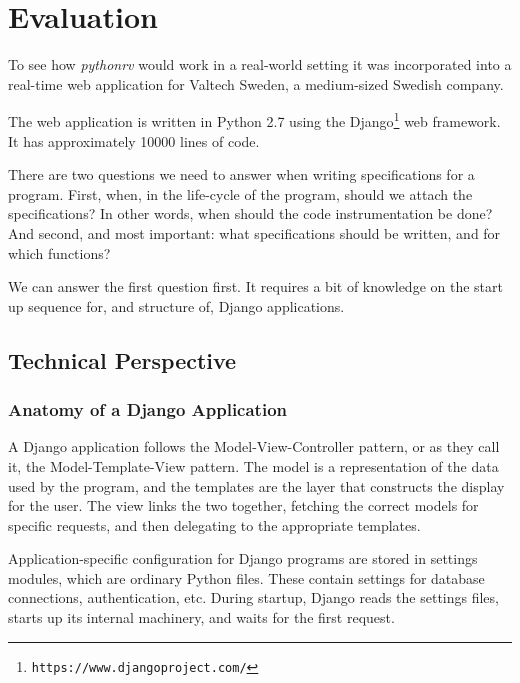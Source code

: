 
\pagestyle{newchap}
\chapter{Evaluation} \label{chapter-evaluation}

To see how \textit{pythonrv} would work in a real-world setting it was
incorporated into a real-time web application for Valtech Sweden, a
medium-sized Swedish company.

The web application is written in Python 2.7 using the
Django\footnote{\texttt{https://www.djangoproject.com/}} web framework. It has
approximately 10000 lines of code.

There are two questions we need to answer when writing specifications for a
program. First, when, in the life-cycle of the program, should we attach the
specifications? In other words, when should the code instrumentation be done?
And second, and most important: what specifications should be written, and for
which functions?

We can answer the first question first. It requires a bit of knowledge on the
start up sequence for, and structure of, Django applications.


\section{Technical Perspective}

\subsection{Anatomy of a Django Application}

A Django application follows the Model-View-Controller pattern, or as they call
it, the Model-Template-View pattern. The model is a representation of the data
used by the program, and the templates are the layer that constructs the
display for the user. The view links the two together, fetching the correct
models for specific requests, and then delegating to the appropriate templates.

Application-specific configuration for Django programs are stored in settings
modules, which are ordinary Python files. These contain settings for database
connections, authentication, etc. During startup, Django reads the settings
files, starts up its internal machinery, and waits for the first request.



